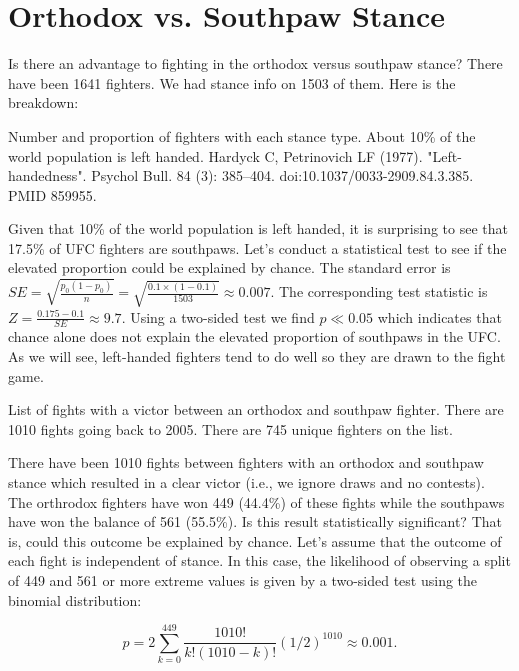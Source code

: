 \clearpage
\section{Orthodox vs. Southpaw Stance}

Is there an advantage to fighting in the orthodox versus southpaw stance?
There have been 1641 fighters. We had stance info on 1503 of them. Here is the
breakdown:

\begin{table}[h]

\caption{Number and proportion of fighters with each stance type. About 10\% of the
world population is left handed. Hardyck C, Petrinovich LF (1977). "Left-handedness". Psychol Bull. 84 (3): 385–404. doi:10.1037/0033-2909.84.3.385. PMID 859955.}
\end{table}

Given that 10\% of the world population is left handed, it is surprising to see that 17.5\%
of UFC fighters are southpaws. Let's conduct a statistical test to see if the elevated
proportion could be explained by chance.
The standard error is $SE = \sqrt{\frac{p_0(1-p_0)}{n}}=\sqrt{\frac{0.1\times(1 - 0.1)}{1503}}\approx0.007$.
The corresponding test statistic is $Z = \frac{0.175 - 0.1}{SE}\approx9.7$. Using a two-sided test
we find $p \ll 0.05$ which indicates that chance alone does not explain the elevated proportion of southpaws in the UFC.
As we will see, left-handed fighters tend to do well so they are drawn to the fight game.

\begin{table}[h]

\caption{List of fights with a victor between an orthodox and southpaw fighter. There are 1010 fights going back to 2005. There are 745 unique fighters on the list.}
\end{table}

There have been 1010 fights between fighters with an orthodox and southpaw stance which resulted in a clear victor (i.e., we ignore draws and no contests). The orthrodox fighters have won 449 (44.4\%) of these fights while the southpaws have won the balance of 561 (55.5\%). Is this result statistically significant? That is, could this outcome be explained by chance. Let's assume that the outcome of each fight is independent of stance. In this case, the likelihood of observing a split of 449 and 561 or more extreme values is given by a two-sided test using the binomial distribution:

\begin{equation}
p = 2\sum_{k=0}^{449} \frac{1010!}{k! (1010-k)!}(1/2)^{1010} \approx 0.001.
\end{equation}

